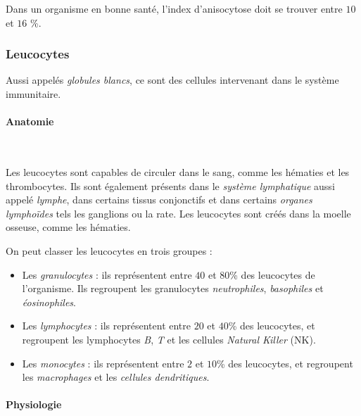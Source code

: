 \documentclass[12pt]{article}
\begin{document}
	Dans un organisme en bonne santé, l'index d'anisocytose doit se trouver entre $10$ et $16$ \%.
	
	\subsubsection{Leucocytes}
	Aussi appelés \textit{globules blancs}, ce sont des cellules intervenant dans le système immunitaire.
	
		\paragraph{Anatomie}\mbox{~}
		
	Les leucocytes sont capables de circuler dans le sang, comme les hématies et les thrombocytes. Ils sont également présents dans le \textit{système lymphatique} aussi appelé \textit{lymphe}, dans certains tissus conjonctifs et dans certains \textit{organes lymphoïdes} tels les ganglions ou la rate. Les leucocytes sont créés dans la moelle osseuse, comme les hématies.
	
	On peut classer les leucocytes en trois groupes :
	\begin{itemize}
	\item Les \textit{granulocytes} : ils représentent entre $40$ et $80$\% des leucocytes de l'organisme. Ils regroupent les granulocytes \textit{neutrophiles}, \textit{basophiles} et \textit{éosinophiles}.
	\item Les \textit{lymphocytes} : ils représentent entre $20$ et $40$\% des leucocytes, et regroupent les lymphocytes \textit{B}, \textit{T} et les cellules \textit{Natural Killer} (NK).
	\item Les \textit{monocytes} : ils représentent entre $2$ et $10$\% des leucocytes, et regroupent les \textit{macrophages} et les \textit{cellules dendritiques}.
	\end{itemize}
	
		\paragraph{Physiologie}\mbox{~}
		
\end{document}
